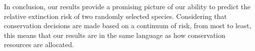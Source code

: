 \documentclass[12pt,letterpaper]{article}
\begin{document}
\begin{refsection}


In conclusion, our results provide a promising picture of our ability to predict the relative extinction risk of two randomly selected species. Considering that conservation decisions are made based on a continuum of risk, from most to least, this means that our results are in the same language as how conservation resources are allocated.


\printbibliography
\end{refsection}
\clearpage
\end{document}
